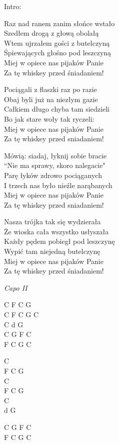 \begin{text}
Intro:\\
    \hfill\break
    \hfill\break
    \hfill\break
    \hfill\break
    \hfill\break

Raz nad ranem zanim słońce wstało\\
Szedłem drogą z głową obolałą\\
Wtem ujrzałem gości z butelczyną\\
Śpiewających głośno pod leszczyną\\
\vin Miej w opiece nas pijaków Panie\\
\vin Za tę whiskey przed śniadaniem!
    \hfill\break
    \hfill\break

Pociągali z flaszki raz po razie\\
Obaj byli już na niezłym gazie\\
Całkiem długo chyba tam siedzieli\\
Bo jak stare woły tak ryczeli:\\
\vin Miej w opiece nas pijaków Panie\\
\vin Za tę whiskey przed sniadaniem!

Mówią: siadaj, łyknij sobie bracie\\
“Nie ma sprawy, skoro nalegacie"\\
Parę łyków zdrowo pociąganych\\
I trzech nas było nieźle narąbanych\\
\vin Miej w opiece nas pijaków Panie\\
\vin Za tę whiskey przed sniadaniem!

Nasza trójka tak się wydzierała\\
Że wioska cała wszystko usłyszała\\
Każdy pędem pobiegł pod leszczynę\\
Wypić tam niejedną butelczynę\\
\vin Miej w opiece nas pijaków Panie\\
\vin Za tę whiskey przed śniadaniem!

\end{text}
\begin{chord}
\textit{Capo II}

C F C G\\
C F C G C\\
C d G\\
C G F C\\
F C G C

C\\
F C G\\
C\\
F C G\\
C\\
d G

C G F C\\
F C G C\\

\end{chord}